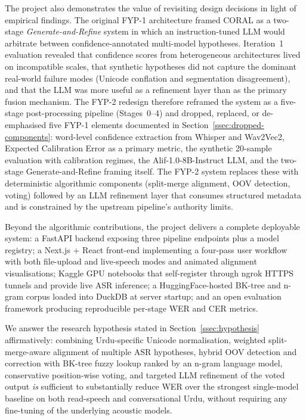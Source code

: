The project also demonstrates the value of revisiting design decisions in light of empirical findings. The original FYP-1 architecture framed CORAL as a two-stage \emph{Generate-and-Refine} system in which an instruction-tuned LLM would arbitrate between confidence-annotated multi-model hypotheses. Iteration~1 evaluation revealed that confidence scores from heterogeneous architectures lived on incompatible scales, that synthetic hypotheses did not capture the dominant real-world failure modes (Unicode conflation and segmentation disagreement), and that the LLM was more useful as a refinement layer than as the primary fusion mechanism. The FYP-2 redesign therefore reframed the system as a five-stage post-processing pipeline (Stages~0--4) and dropped, replaced, or de-emphasised five FYP-1 elements documented in Section~\ref{ssec:dropped-components}: word-level confidence extraction from Whisper and Wav2Vec2, Expected Calibration Error as a primary metric, the synthetic 20-sample evaluation with calibration regimes, the Alif-1.0-8B-Instruct LLM, and the two-stage Generate-and-Refine framing itself. The FYP-2 system replaces these with deterministic algorithmic components (split-merge alignment, OOV detection, voting) followed by an LLM refinement layer that consumes structured metadata and is constrained by the upstream pipeline's authority limits.

Beyond the algorithmic contributions, the project delivers a complete deployable system: a FastAPI backend exposing three pipeline endpoints plus a model registry; a Next.js + React front-end implementing a four-pass user workflow with both file-upload and live-speech modes and animated alignment visualisations; Kaggle GPU notebooks that self-register through ngrok HTTPS tunnels and provide live ASR inference; a HuggingFace-hosted BK-tree and n-gram corpus loaded into DuckDB at server startup; and an open evaluation framework producing reproducible per-stage WER and CER metrics.

We answer the research hypothesis stated in Section~\ref{ssec:hypothesis} affirmatively: combining Urdu-specific Unicode normalisation, weighted split-merge-aware alignment of multiple ASR hypotheses, hybrid OOV detection and correction with BK-tree fuzzy lookup ranked by an n-gram language model, conservative position-wise voting, and targeted LLM refinement of the voted output \emph{is} sufficient to substantially reduce WER over the strongest single-model baseline on both read-speech and conversational Urdu, without requiring any fine-tuning of the underlying acoustic models.


